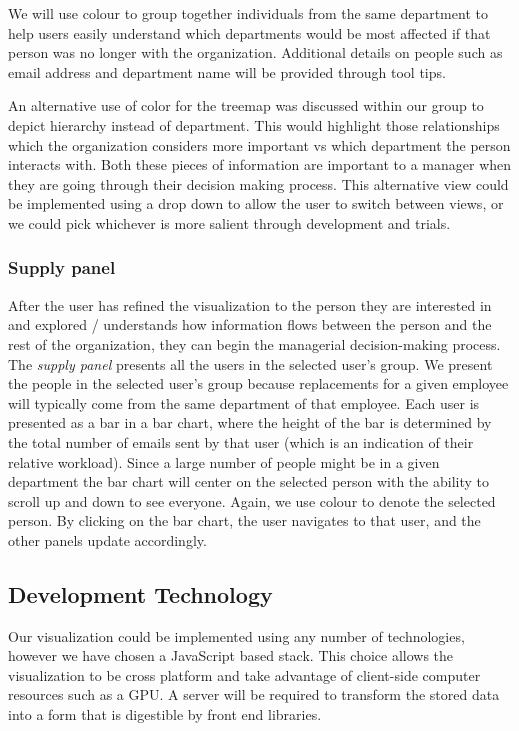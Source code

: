 \documentclass[12pt,letterpaper]{article}
\begin{document}
We will use colour to group together individuals from the same department to help users easily understand which departments would be most affected if that person was no longer with the organization.  Additional details on people\cite{anafigueiras} such as email address and department name will be provided through tool tips. 

An alternative use of color for the treemap was discussed within our group to depict hierarchy instead of department.  This would highlight those relationships which the organization considers more important vs which department the person interacts with.  Both these pieces of information are important to a manager when they are going through their decision making process.  This alternative view could be implemented using a drop down to allow the user to switch between views, or we could pick whichever is more salient through development and trials.

\subsubsection{Supply panel}

After the user has refined the visualization to the person they are interested in and explored / understands how information flows between the person and the rest of the organization, they can begin the managerial decision-making process. The \emph{supply panel} presents all the users in the selected user's group. We present the people in the selected user's group because replacements for a given employee will typically come from the same department of that employee. Each user is presented as a bar in a bar chart, where the height of the bar is determined by the total number of emails sent by that user (which is an indication of their relative workload). Since a large number of people might be in a given department the bar chart will center on the selected person with the ability to scroll up and down to see everyone.  Again, we use colour to denote the selected person.  By clicking on the bar chart, the user navigates to that user, and the other panels update accordingly.

\subsection{Development Technology}
Our visualization could be implemented using any number of technologies, however we have chosen a JavaScript based stack.  This choice allows the visualization to be cross platform and take advantage of client-side computer resources such as a GPU.  A server will be required to transform the stored data into a form that is digestible by front end libraries.
\end{document}
